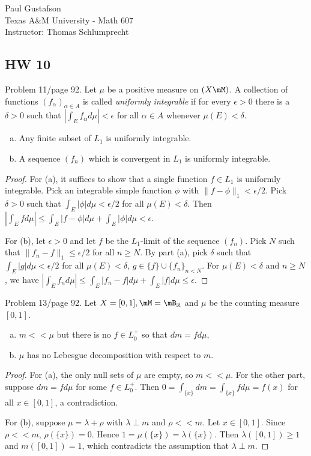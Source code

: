 \documentclass{article}
\begin{document}
\noindent Paul Gustafson\\
\noindent Texas A\&M University - Math 607\\ 
\noindent Instructor: Thomas Schlumprecht


\subsection*{HW 10}
  Problem 11/page 92. Let $\mu$ be a positive measure on $(X \mM)$. A collection of functions $(f_\alpha)_{\alpha \in A}$ is called \emph{uniformly integrable} if for every $\epsilon > 0$ there is a $\delta > 0$ such that $\left| \int_E f_\alpha d\mu \right| < \epsilon$ for all $\alpha \in A$ whenever $\mu(E) < \delta$.
\begin{enumerate}[a)]
\item Any finite subset of $L_1$ is uniformly integrable.
\item A sequence $(f_n)$ which is convergent in $L_1$ is uniformly integrable.
\end{enumerate}
\begin{proof}
For (a), it suffices to show that a single function $f \in L_1$ is uniformly integrable.  Pick an integrable simple function $\phi$ with
 $\|f - \phi\|_1 < \epsilon/2$.  Pick $\delta > 0$ such that $\int_E |\phi| d\mu < \epsilon/2$ for all $\mu(E) < \delta$.  
Then $\left| \int_E f d\mu \right| \le \int_E |f - \phi| d\mu + \int_E |\phi| d\mu < \epsilon$.

For (b), let $\epsilon > 0$ and let $f$ be the $L_1$-limit of the sequence $(f_n)$.  Pick $N$ such that $\| f_n - f \|_1 \le \epsilon/2$ for all $n \ge N$.  By part (a), pick $\delta$ such that $\int_E |g| d\mu  < \epsilon/2$ for all $\mu(E) < \delta$, $g \in \{f\} \cup \{f_n\}_{n < N}$.  
For $\mu(E) < \delta$ and $n \ge N$, we have 
$\left| \int_E f_n d\mu \right| \le \int_E |f_n -f| d\mu + \int_E |f| d\mu \le \epsilon$.
\end{proof}

 Problem 13/page 92.  Let $X = [0,1], \mM = \mB_\R$ and $\mu$ be the counting measure $[0,1]$.
\begin{enumerate}[a)]
\item $m << \mu$ but there is no $f \in L_0^+$ so that $dm = f d\mu$,
\item $\mu$ has no Lebesgue decomposition with respect to $m$.
\end{enumerate}
\begin{proof}
For (a), the only null sets of $\mu$ are empty, so $m << \mu$.  For the other part, suppose $dm = f d\mu$ for some $f \in L_0^+$.  Then $0 = \int_{\{x\}} dm = \int_{\{x\}} f d\mu = f(x)$ for all $x \in [0,1]$, a contradiction.

For (b), suppose $\mu = \lambda + \rho$ with $\lambda \perp m$ and $\rho << m$. Let $x \in [0,1]$.  Since $\rho << m$, $\rho(\{x\}) = 0$.  Hence $1 = \mu(\{x\}) = \lambda(\{x\})$. Then $\lambda([0,1]) \ge 1$ and $m([0,1]) = 1$, which contradicts the assumption that $\lambda \perp m$.
\end{proof}
\end{document}

